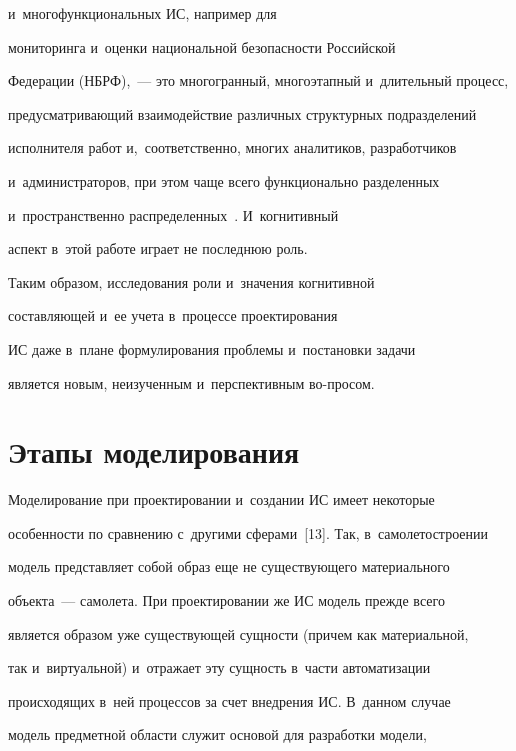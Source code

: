 и~многофункциональных ИС, например для 


мониторинга и~оценки национальной без\-опас\-ности Российской  


Федерации (НБРФ),~--- это многогранный, многоэтапный и~длительный процесс, 


предусматривающий взаимодействие различных структурных подразделений 


исполнителя работ и,~соответственно, многих аналитиков, разработчиков 


и~администраторов, при этом чаще всего функционально разделенных 


и~пространственно распределенных~\cite{1-luk, 3-luk}. И~когнитивный 


аспект в~этой работе играет не последнюю роль.


    


    Таким образом, исследования роли и~значения когнитивной 


составляющей и~ее учета в~процессе проектирования 


ИС даже в~плане формулирования проб\-ле\-мы и~постановки задачи 


является новым, неизученным и~перспективным во-\linebreak просом.





\section{Этапы моделирования}





    Моделирование при проектировании и~создании ИС имеет некоторые 


особенности по сравнению с~другими сферами~[13]. Так, в~самолетостроении 


модель представляет собой образ еще не существующего материального 


объекта~--- самолета. При проектировании же ИС модель прежде всего 


является образом уже существующей сущности (причем как материальной, 


так и~виртуальной) и~отражает эту сущность в~части автоматизации 


происходящих в~ней процессов за счет внедрения ИС. В~данном случае 


модель предметной области служит основой для разработки модели, 


